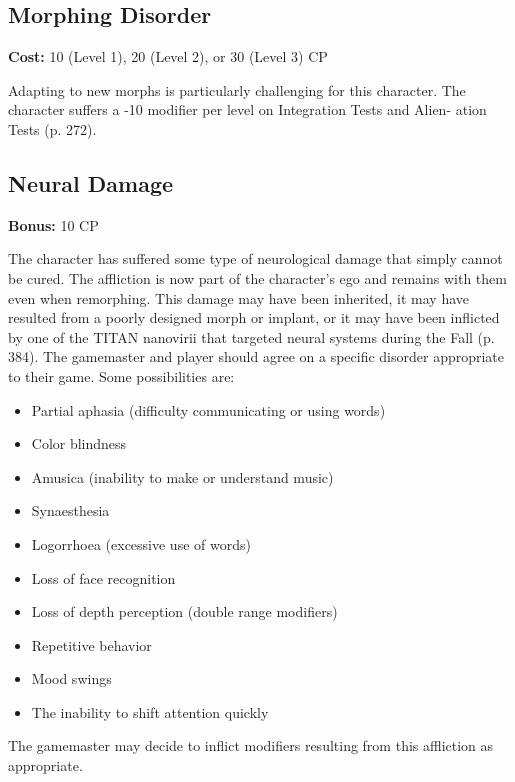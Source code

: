 \subsection{Morphing Disorder}
\label{sec:traits-morphing-disorder}

\textbf{Cost:} 10 (Level 1), 20 (Level 2), or 30 (Level 3) CP

Adapting to new morphs is particularly challenging for this character. The character suffers a -10 modifier per level on Integration Tests and Alien- ation Tests (p. 272).

\subsection{Neural Damage}
\label{sec:traits-neural-damage}

\textbf{Bonus:} 10 CP

The character has suffered some type of neurological damage that simply cannot be cured. The affliction is now part of the character’s ego and remains with them even when remorphing. This damage may have been inherited, it may have resulted from a poorly designed morph or implant, or it may have been inflicted by one of the TITAN nanovirii that targeted neural systems during the Fall (p. 384). The gamemaster and player should agree on a specific disorder appropriate to their game. Some possibilities are:

\begin{itemize}
\item Partial aphasia (difficulty communicating or using words)
\item Color blindness
\item Amusica (inability to make or understand music)
\item Synaesthesia
\item Logorrhoea (excessive use of words)
\item Loss of face recognition
\item Loss of depth perception (double range modifiers)
\item Repetitive behavior
\item Mood swings
\item The inability to shift attention quickly
\end{itemize}

The gamemaster may decide to inflict modifiers resulting from this affliction as appropriate.


